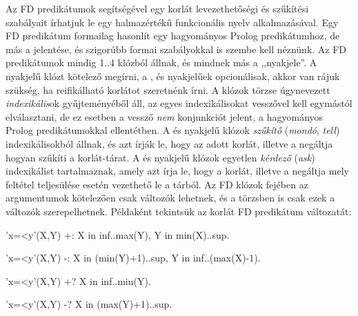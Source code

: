 Az FD predikátumok segítségével egy korlát levezethetőségi és szűkítési szabályait
írhatjuk le egy halmazértékű funkcionális nyelv alkalmazásával. Egy FD predikátum
formailag hasonlít egy hagyományos Prolog predikátumhoz, de más a jelentése, és
szigorúbb formai szabályokkal is szembe kell néznünk.
\br
Az FD predikátumok mindig 1..4 klózból állnak, és mindnek más a ,,nyakjele''. A
\cd{+:} nyakjelű klózt kötelező megírni, a \cd{-:},  és  nyakjelűek
opcionálisak, akkor van rájuk szükség, ha reifikálható korlátot szeretnénk írni.
A klózok törzse úgynevezett \emph{indexikális}ok gyűjteményéből áll, az egyes
indexikálisokat vesszővel kell egymástól elválasztani, de ez esetben a vessző
\emph{nem} konjunkciót jelent, a hagyományos Prolog predikátumokkal ellentétben.
A \cd{+:} és \cd{-:} nyakjelű klózok \emph{szűkítő} (\emph{mondó}, \emph{tell})
indexikálisokból állnak, és azt írják le, hogy az adott korlát, illetve a negáltja
hogyan szűkíti a korlát-tárat. A  és  nyakjelű klózok egyetlen
\emph{kérdező} (\emph{ask}) indexikálist tartalmaznak, amely azt írja le, hogy
a korlát, illetve a negáltja mely feltétel teljesülése esetén vezethető le a
tárból. Az FD klózok fejében az argumentumok kötelezően csak változók lehetnek,
és a törzsben is csak ezek a változók szerepelhetnek. Példaként tekintsük az
 korlát FD predikátum változatát:

\begin{prologcode}
'x=<y'(X,Y) +:                 %
        X in inf..max(Y),      %
        Y in min(X)..sup.      %

'x=<y'(X,Y) -:                 %
        X in (min(Y)+1)..sup,  %
        Y in inf..(max(X)-1).  %

'x=<y'(X,Y) +?                 %
        X in inf..min(Y).      %

'x=<y'(X,Y) -?                 %
        X in (max(Y)+1)..sup.  %
\end{prologcode}

